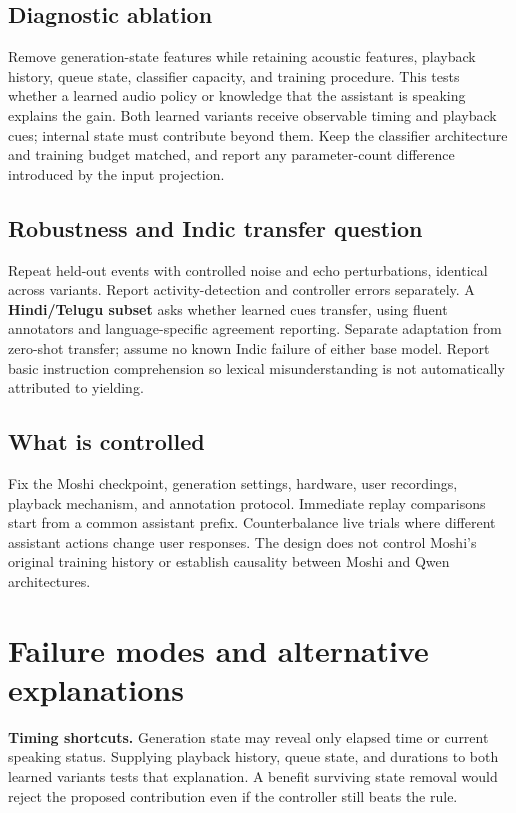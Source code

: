 \documentclass[11pt]{article}
\begin{document}
\subsection{Diagnostic ablation}

Remove generation-state features while retaining acoustic features, playback history, queue state, classifier capacity, and training procedure. This tests whether a learned audio policy or knowledge that the assistant is speaking explains the gain. Both learned variants receive observable timing and playback cues; internal state must contribute beyond them. Keep the classifier architecture and training budget matched, and report any parameter-count difference introduced by the input projection.

\subsection{Robustness and Indic transfer question}

Repeat held-out events with controlled noise and echo perturbations, identical across variants. Report activity-detection and controller errors separately. A \textbf{Hindi/Telugu subset} asks whether learned cues transfer, using fluent annotators and language-specific agreement reporting. Separate adaptation from zero-shot transfer; assume no known Indic failure of either base model. Report basic instruction comprehension so lexical misunderstanding is not automatically attributed to yielding.

\subsection{What is controlled}

Fix the Moshi checkpoint, generation settings, hardware, user recordings, playback mechanism, and annotation protocol. Immediate replay comparisons start from a common assistant prefix. Counterbalance live trials where different assistant actions change user responses. The design does not control Moshi's original training history or establish causality between Moshi and Qwen architectures.

\newpage
\section{Failure modes and alternative explanations}

\textbf{Timing shortcuts.} Generation state may reveal only elapsed time or current speaking status. Supplying playback history, queue state, and durations to both learned variants tests that explanation. A benefit surviving state removal would reject the proposed contribution even if the controller still beats the rule.
\end{document}
